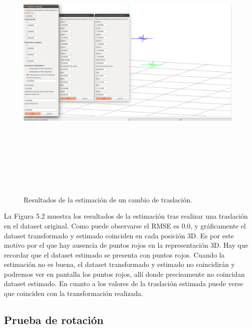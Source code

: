 \begin{figure}[H]
\label{fig:traslaTest}\includegraphics[height=14.0cm,width=18.0cm]{img/cap6/Traslation_abba.png}
\hspace{0.5cm}


\caption{Resultados de la estimación de un cambio de traslación.}
\end{figure}


La Figura 5.2 muestra los resultados de la estimación tras realizar una traslación en el dataset original. Como puede observarse el RMSE es 0.0, y gráficamente el dataset transformado y estimado coinciden en cada posición 3D. Es por este motivo por el que hay ausencia de puntos rojos en la representación 3D. Hay que recordar que el dataset estimado se presenta con puntos rojos. Cuando la estimación no es buena, el dataset transformado y estimado no coincidirán y podremos ver en pantalla los puntos rojos, allí donde precisamente no coincidan dataset estimado. En cuanto a los valores de la traslación estimada puede verse que coinciden con la transformación realizada.

\subsection{Prueba de rotación}

